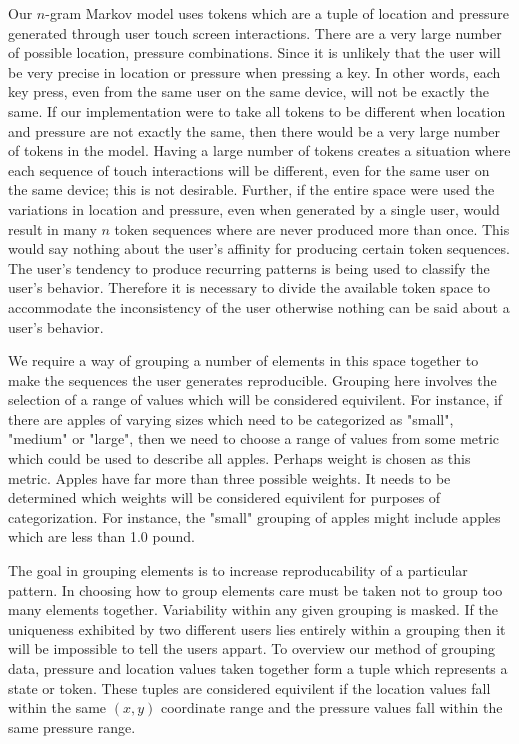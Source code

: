 Our $n$-gram Markov model uses tokens
which are a tuple of location and pressure
generated through user touch screen interactions. 
There are a very large number of possible
location, pressure combinations.
%
Since it is unlikely that the user will be
very precise in location or pressure
when pressing a key.
In other words,
each key press, 
even from the same user on the same device,
will not be exactly the same.
%
If our implementation were to take all tokens to be different when
location and pressure are not exactly the same,
then there would be a very large number of tokens in the model.
%
Having a large number of tokens
creates a situation where each sequence of 
touch interactions will be different,
even for the same user on the same device;
this is not desirable.
%
Further, if the entire space were used 
the variations in location and pressure,
even when generated by a single user,
would result in many $n$ token sequences
where are never produced more than once.
%
This would say nothing about
the user's affinity for producing certain token sequences.
The user's tendency to produce recurring patterns
is being used to classify the user's behavior.
%
Therefore it is necessary to divide the available token space
to accommodate the inconsistency of the user
otherwise
nothing can be said about a user's behavior.

We require a way of grouping a number of elements in this space together
to make the sequences the user generates reproducible.
%
Grouping here involves the selection of
a range of values which will be considered equivilent.
%
For instance, 
if there are apples of varying sizes
which need to be categorized as "small", "medium" or "large",
then we need to choose a range of values 
from some metric which could be used to describe all apples.
Perhaps weight is chosen as this metric.
Apples have far more than three possible weights.
It needs to be determined which weights will be considered equivilent for
purposes of categorization.
%
For instance, the "small" grouping of apples might include
apples which are less than 1.0 pound.

The goal in grouping elements is to
increase reproducability of a particular pattern.
%
In choosing how to group elements
care must be taken not to group too many 
elements together.
Variability within any given grouping 
is masked.
If 
the uniqueness exhibited by 
two different users lies entirely within
a grouping
then 
it will be impossible to tell the users appart.
%
To overview our method of grouping data,
pressure and location values taken together form a tuple
which represents a state or token.
These tuples are considered equivilent 
if
the location values fall within the same $(x,y)$ coordinate range and
the pressure values fall within the same pressure range.

